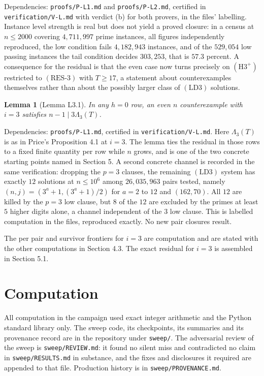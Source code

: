 \documentclass[11pt]{article}
\newtheorem{lemma}[theorem]{Lemma}
\theoremstyle{remark}
\newcommand{\LDthree}{\ensuremath{\mathrm{(LD3)}}}
\newcommand{\RESthree}{\ensuremath{\mathrm{(RES\text{-}3)}}}
\begin{document}
Dependencies: \texttt{proofs/P-L1.md} and \texttt{proofs/P-L2.md}, certified in \texttt{verification/V-L.md} with verdict (b) for both provers, in the files' labelling. Instance level strength is real but does not yield a proved closure: in a census at $n\le 2000$ covering $4{,}711{,}997$ prime instances, all figures independently reproduced, the low condition fails $4{,}182{,}943$ instances, and of the $529{,}054$ low passing instances the tail condition decides $303{,}253$, that is $57.3$ percent. A consequence for the residual is that the even case now turns precisely on $(\mathrm{H3^+})$ restricted to \RESthree{} with $T\ge 17$, a statement about counterexamples themselves rather than about the possibly larger class of \LDthree{} solutions.

\begin{lemma}[Lemma L3.1]
\label{lem:L31}
In any $h=0$ row, an even $n$ counterexample with $i=3$ satisfies $n-1\mid 3\Lambda_3(T)$.
\end{lemma}

Dependencies: \texttt{proofs/P-L1.md}, certified in \texttt{verification/V-L.md}. Here $\Lambda_3(T)$ is as in Price's Proposition 4.1 at $i=3$. The lemma ties the residual in those rows to a fixed finite quantity per row while $n$ grows, and is one of the two concrete starting points named in Section 5. A second concrete channel is recorded in the same verification: dropping the $p=3$ clauses, the remaining \LDthree{} system has exactly $12$ solutions at $n\le 10^6$ among $26{,}035{,}963$ pairs tested, namely $(n,j)=(3^a+1,(3^a+1)/2)$ for $a=2$ to $12$ and $(162,70)$. All $12$ are killed by the $p=3$ low clause, but $8$ of the $12$ are excluded by the primes at least $5$ higher digits alone, a channel independent of the $3$ low clause. This is labelled computation in the files, reproduced exactly. No new pair closures result.

The per pair and survivor frontiers for $i=3$ are computation and are stated with the other computations in Section 4.3. The exact residual for $i=3$ is assembled in Section 5.1.


\section{Computation}

All computation in the campaign used exact integer arithmetic and the Python standard library only. The sweep code, its checkpoints, its summaries and its provenance record are in the repository under \texttt{sweep/}. The adversarial review of the sweep is \texttt{sweep/REVIEW.md}: it found no silent miss and contradicted no claim in \texttt{sweep/RESULTS.md} in substance, and the fixes and disclosures it required are appended to that file. Production history is in \texttt{sweep/PROVENANCE.md}.
\end{document}
